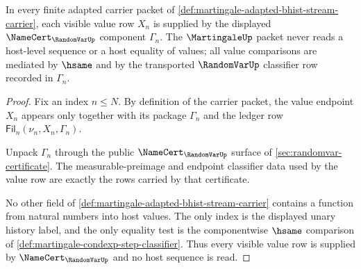 \begin{theorem}
\label{thm:martingale-randomvar-boundary}
In every finite adapted carrier packet of
\autoref{def:martingale-adapted-bhist-stream-carrier}, each visible value row
$X_n$ is supplied by the displayed $\NameCert_{\RandomVarUp}$ component
$\Gamma_n$. The $\MartingaleUp$ packet never reads a host-level sequence or a
host equality of values; all value comparisons are mediated by $\hsame$ and
by the transported $\RandomVarUp$ classifier row recorded in $\Gamma_n$.
\end{theorem}
\begin{proof}
Fix an index $n\leq N$. By definition of the carrier packet, the value
endpoint $X_n$ appears only together with its package $\Gamma_n$ and the
ledger row $\mathsf{Fil}_n(\nu_n,X_n,\Gamma_n)$.

Unpack $\Gamma_n$ through the public $\NameCert_{\RandomVarUp}$ surface of
\autoref{sec:randomvar-certificate}. The measurable-preimage and endpoint
classifier data used by the value row are exactly the rows carried by that
certificate.

No other field of \autoref{def:martingale-adapted-bhist-stream-carrier}
contains a function from natural numbers into host values. The only index is
the displayed unary history label, and the only equality test is the
componentwise $\hsame$ comparison of
\autoref{def:martingale-condexp-step-classifier}. Thus every visible value
row is supplied by $\NameCert_{\RandomVarUp}$ and no host sequence is read.
\end{proof}

